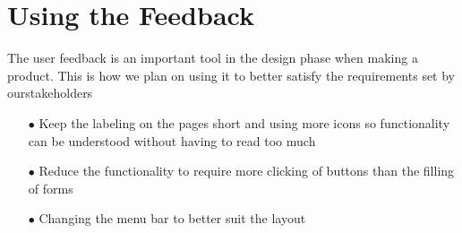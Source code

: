 \documentclass[11pt]{article}
\begin{document}
\section{Using the Feedback}
	The user feedback is an important tool in the design phase when making a product. This is how we plan on using it to better satisfy the requirements set by ourstakeholders
	\begin{itemize}
		\item[$\bullet$] Keep the labeling on the pages short and using more icons so functionality can be understood without having to read too much	
		\item[$\bullet$] Reduce the functionality to require more clicking of buttons than the filling of forms
		\item[$\bullet$] Changing the menu bar to better suit the layout
	\end{itemize}
\end{document}
